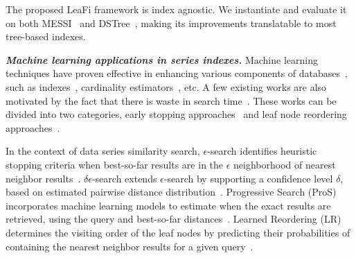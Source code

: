 The proposed LeaFi framework is index agnostic.
We instantiate and evaluate it on both MESSI~\cite{messijournal} and DSTree~\cite{DBLP:journals/pvldb/WangWPWH13}, making its improvements translatable to most tree-based indexes.

\noindent \textbf{\textit{Machine learning applications in series indexes.}}
\label{sec-lit-learned-index}
Machine learning techniques have proven effective in enhancing various components of databases~\cite{DBLP:conf/sigmod/0001ZC21, DBLP:conf/sigmod/SaxenaRCLCCMKPN23}, such as indexes~\cite{DBLP:conf/sigmod/KraskaBCDP18, DBLP:conf/sigmod/NathanDAK20, DBLP:journals/pvldb/DingNAK20, DBLP:conf/icde/LiZSWT020, DBLP:conf/kdd/WangP21}, cardinality estimators~\cite{DBLP:conf/sigmod/Sun0021, DBLP:conf/sigmod/KimJSHCC22, DBLP:journals/pacmmod/WuNAKM23}, etc.
A few existing works are also motivated by the fact that there is waste in search time~\cite{DBLP:conf/sigmod/GogolouTEBP20, DBLP:journals/vldb/EchihabiTGBP23}. 
These works can be divided into two categories, early stopping approaches~\cite{DBLP:journals/pvldb/EchihabiZPB19, DBLP:conf/sigmod/GogolouTEBP20, DBLP:journals/vldb/EchihabiTGBP23} and leaf node reordering approaches~\cite{SC:kang2021case}.

In the context of data series similarity search, $\epsilon$-search identifies heuristic stopping criteria when best-so-far results are in the $\epsilon$ neighborhood of nearest neighbor results~\cite{DBLP:journals/pvldb/EchihabiZPB19}.
$\delta\epsilon$-search extends $\epsilon$-search by supporting a confidence level $\delta$, based on estimated pairwise distance distribution~\cite{DBLP:journals/pvldb/EchihabiZPB19}.
Progressive Search (ProS) incorporates machine learning models to estimate when the exact results are retrieved, using the query and best-so-far distances~\cite{DBLP:conf/sigmod/GogolouTEBP20, DBLP:journals/vldb/EchihabiTGBP23}.
Learned Reordering (LR) determines the visiting order of the leaf nodes by predicting their probabilities of containing the nearest neighbor results for a given query~\cite{SC:kang2021case}.

